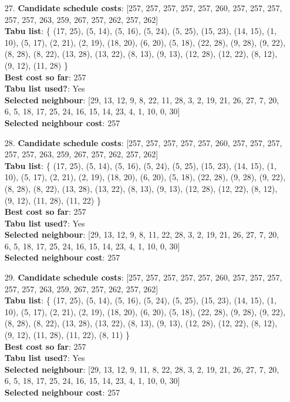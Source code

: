 \documentclass[fleqn]{article}
\begin{document}
\begin{itemize}
    \item[27.] \textbf{Candidate schedule costs}: [257, 257, 257, 257, 257, 260, 257, 257, 257, 257, 257, 263, 259, 267, 257, 262, 257, 262] \\
    \textbf{Tabu list}: \{ (17, 25), (5, 14), (5, 16), (5, 24), (5, 25), (15, 23), (14, 15), (1, 10), (5, 17), (2, 21), (2, 19), (18, 20), (6, 20), (5, 18), (22, 28), (9, 28), (9, 22), (8, 28), (8, 22), (13, 28), (13, 22), (8, 13), (9, 13), (12, 28), (12, 22), (8, 12), (9, 12), (11, 28) \} \\
    \textbf{Best cost so far}: 257 \\
    \textbf{Tabu list used?}: Yes \\
    \textbf{Selected neighbour}: [29, 13, 12, 9, 8, 22, 11, 28, 3, 2, 19, 21, 26, 27, 7, 20, 6, 5, 18, 17, 25, 24, 16, 15, 14, 23, 4, 1, 10, 0, 30] \\
    \textbf{Selected neighbour cost}: 257
      

    \item[28.] \textbf{Candidate schedule costs}: [257, 257, 257, 257, 257, 260, 257, 257, 257, 257, 257, 263, 259, 267, 257, 262, 257, 262] \\
    \textbf{Tabu list}: \{ (17, 25), (5, 14), (5, 16), (5, 24), (5, 25), (15, 23), (14, 15), (1, 10), (5, 17), (2, 21), (2, 19), (18, 20), (6, 20), (5, 18), (22, 28), (9, 28), (9, 22), (8, 28), (8, 22), (13, 28), (13, 22), (8, 13), (9, 13), (12, 28), (12, 22), (8, 12), (9, 12), (11, 28), (11, 22) \} \\
    \textbf{Best cost so far}: 257 \\
    \textbf{Tabu list used?}: Yes \\
    \textbf{Selected neighbour}: [29, 13, 12, 9, 8, 11, 22, 28, 3, 2, 19, 21, 26, 27, 7, 20, 6, 5, 18, 17, 25, 24, 16, 15, 14, 23, 4, 1, 10, 0, 30] \\
    \textbf{Selected neighbour cost}: 257
      

    \item[29.] \textbf{Candidate schedule costs}: [257, 257, 257, 257, 257, 260, 257, 257, 257, 257, 257, 263, 259, 267, 257, 262, 257, 262] \\
    \textbf{Tabu list}: \{ (17, 25), (5, 14), (5, 16), (5, 24), (5, 25), (15, 23), (14, 15), (1, 10), (5, 17), (2, 21), (2, 19), (18, 20), (6, 20), (5, 18), (22, 28), (9, 28), (9, 22), (8, 28), (8, 22), (13, 28), (13, 22), (8, 13), (9, 13), (12, 28), (12, 22), (8, 12), (9, 12), (11, 28), (11, 22), (8, 11) \} \\
    \textbf{Best cost so far}: 257 \\
    \textbf{Tabu list used?}: Yes \\
    \textbf{Selected neighbour}: [29, 13, 12, 9, 11, 8, 22, 28, 3, 2, 19, 21, 26, 27, 7, 20, 6, 5, 18, 17, 25, 24, 16, 15, 14, 23, 4, 1, 10, 0, 30] \\
    \textbf{Selected neighbour cost}: 257
      


\end{itemize}
\end{document}
